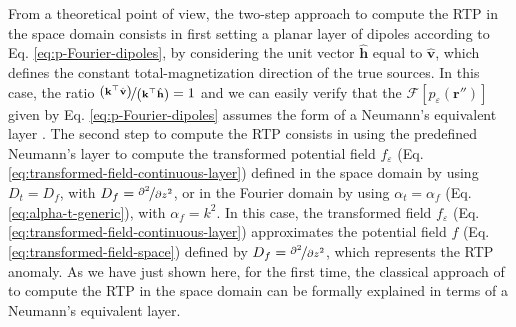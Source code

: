 From a theoretical point of view, the two-step approach to compute the RTP in the space domain 
consists in first setting a planar layer of dipoles according to Eq. \ref{eq:p-Fourier-dipoles}, 
by considering the unit vector $\hat{\mathbf{h}}$ equal to $\hat{\mathbf{v}}$, which defines 
the constant total-magnetization direction of the true sources.
In this case, the ratio $\nicefrac{\left(\mathbf{k}^{\top} \hat{\mathbf{v}} \right)}{\left(\mathbf{k}^{\top} \hat{\mathbf{h}} \right)} = 1$ 
and we can easily verify that the $\mathcal{F} [ p_{\varepsilon}(\mathbf{r}'') ]$ given by 
Eq. \ref{eq:p-Fourier-dipoles} assumes the form of a Neumann's equivalent layer \citep{oliveirajr_etal2026_1}.
The second step to compute the RTP consists in using the predefined Neumann's layer to compute 
the transformed potential field $f_{\varepsilon}$ (Eq. \ref{eq:transformed-field-continuous-layer}) defined in the 
space domain by using $D_{t} = D_{f}$, with $D_{f} = \nicefrac{\partial^{2}}{\partial z^{2}}$, or in the Fourier domain 
by using $\alpha_{t} = \alpha_{f}$ (Eq. \ref{eq:alpha-t-generic}), with 
$\alpha_{f} = k^{2}$.
In this case, the transformed field $f_{\varepsilon}$ (Eq. \ref{eq:transformed-field-continuous-layer}) 
approximates the potential field $f$ (Eq. \ref{eq:transformed-field-space}) defined by 
$D_{f} = \nicefrac{\partial^{2}}{\partial z^{2}}$, which represents the RTP anomaly. 
As we have just shown here, for the first time, the classical approach of \cite{silva1986} to compute the RTP in the 
space domain can be formally explained in terms of a Neumann's equivalent layer. 

